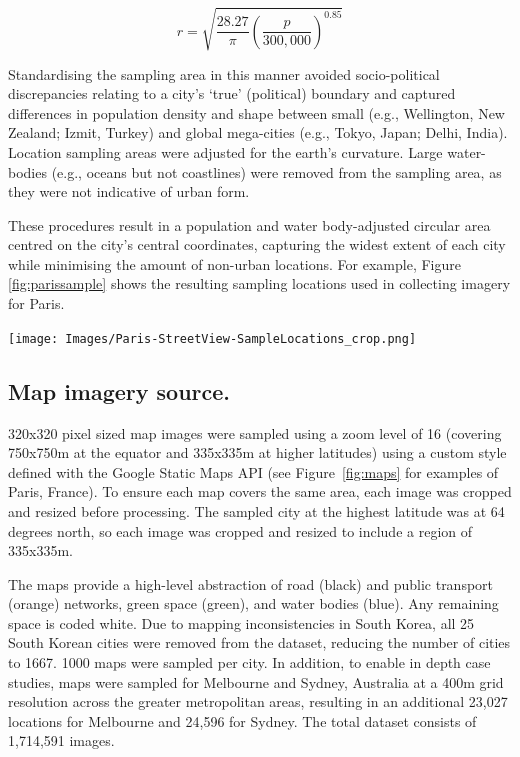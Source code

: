 \documentclass{nature}
\makeatletter
\renewenvironment*{figure}{\@float{figure}}{\end@float}
\makeatother
\begin{document}
\begin{methods}
\begin{equation}
r = \sqrt{ \frac{28.27}{\pi} \left( \frac{p}{300,000}  \right) ^{0.85} }
\end{equation}


Standardising the sampling area in this manner avoided socio-political discrepancies relating to a city's `true' (political) boundary and captured differences in population density and shape between small (e.g., Wellington, New Zealand; Izmit, Turkey) and global mega-cities (e.g., Tokyo, Japan;  Delhi, India). Location sampling areas were adjusted for the earth's curvature\cite{Sinnott1984}. Large water-bodies (e.g., oceans but not coastlines) were removed from the sampling area, as they were not indicative of urban form. 

These procedures result in a population and water body-adjusted circular area centred on the city's central coordinates, capturing the widest extent of each city while minimising the amount of non-urban locations. For example, Figure \ref{fig:parissample} shows the resulting sampling locations used in collecting imagery for Paris. 

\begin{figure}
    \centering    
\texttt{[image: Images/Paris-StreetView-SampleLocations\_crop.png]}  
\caption{\bf Sampling locations for map imagery (from Paris, France)\cite{GoogleStatic2017}.}    
 \label{fig:parissample}  
\end{figure} 



\subsection{Map imagery source.}\label{methodsimagery}

320x320 pixel sized map images were sampled using a zoom level of 16 (covering 750x750m at the equator and 335x335m at higher latitudes) using a custom style defined with the Google Static Maps API\cite{GoogleStatic2017} (see Figure~\ref{fig:maps} for examples of Paris, France). To ensure each map covers the same area, each image was cropped and resized before processing. The sampled city at the highest latitude was at 64 degrees north, so each image was cropped and resized to include a region of 335x335m. 

The maps provide a high-level abstraction of road (black) and public transport (orange) networks, green space (green), and water bodies (blue). Any remaining space is coded white. Due to mapping inconsistencies in South Korea, all 25 South Korean cities were removed from the dataset, reducing the number of cities to 1667. 1000 maps were sampled per city. In addition, to enable in depth case studies, maps were sampled for Melbourne and Sydney, Australia at a 400m grid resolution across the greater metropolitan areas, resulting in an additional 23,027 locations for Melbourne and 24,596 for Sydney. The total dataset consists of 1,714,591 images.




\end{methods}
\end{document}
